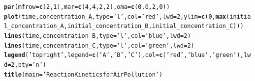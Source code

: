 \documentclass{tufte-handout}\usepackage[]{graphicx}\usepackage[]{xcolor}
\makeatletter
\newcommand{\hlnum}[1]{\textcolor[rgb]{0.686,0.059,0.569}{#1}}%
\newcommand{\hlstr}[1]{\textcolor[rgb]{0.192,0.494,0.8}{#1}}%
\newcommand{\hlstd}[1]{\textcolor[rgb]{0.345,0.345,0.345}{#1}}%
\newcommand{\hlkwc}[1]{\textcolor[rgb]{0.333,0.667,0.333}{#1}}%
\newcommand{\hlkwd}[1]{\textcolor[rgb]{0.737,0.353,0.396}{\textbf{#1}}}%
\newenvironment{kframe}{%
 \def\at@end@of@kframe{}%
 \ifinner\ifhmode%
  \def\at@end@of@kframe{\end{minipage}}%
  \begin{minipage}{\columnwidth}%
 \fi\fi%
 \def\FrameCommand##1{\hskip\@totalleftmargin \hskip-\fboxsep
 \colorbox{shadecolor}{##1}\hskip-\fboxsep
     \hskip-\linewidth \hskip-\@totalleftmargin \hskip\columnwidth}%
 \MakeFramed {\advance\hsize-\width
   \@totalleftmargin\z@ \linewidth\hsize
   \@setminipage}}%
 {\par\unskip\endMakeFramed%
 \at@end@of@kframe}
\newenvironment{knitrout}{}{} %
\makeatother
\begin{document}
\begin{knitrout}
\begin{kframe}
\begin{alltt}
\hlkwd{par}\hlstd{(}\hlkwc{mfrow} \hlstd{=} \hlkwd{c}\hlstd{(}\hlnum{2}\hlstd{,} \hlnum{1}\hlstd{),} \hlkwc{mar} \hlstd{=} \hlkwd{c}\hlstd{(}\hlnum{4}\hlstd{,} \hlnum{4}\hlstd{,} \hlnum{2}\hlstd{,} \hlnum{2}\hlstd{),} \hlkwc{oma} \hlstd{=} \hlkwd{c}\hlstd{(}\hlnum{0}\hlstd{,} \hlnum{0}\hlstd{,} \hlnum{2}\hlstd{,} \hlnum{0}\hlstd{))}
\hlkwd{plot}\hlstd{(time, concentration_A,} \hlkwc{type} \hlstd{=} \hlstr{'l'}\hlstd{,} \hlkwc{col} \hlstd{=} \hlstr{'red'}\hlstd{,} \hlkwc{lwd} \hlstd{=} \hlnum{2}\hlstd{,} \hlkwc{ylim} \hlstd{=} \hlkwd{c}\hlstd{(}\hlnum{0}\hlstd{,} \hlkwd{max}\hlstd{(initial_concentration_A, initial_concentration_B, initial_concentration_C)))}
\hlkwd{lines}\hlstd{(time, concentration_B,} \hlkwc{type} \hlstd{=} \hlstr{'l'}\hlstd{,} \hlkwc{col} \hlstd{=} \hlstr{'blue'}\hlstd{,} \hlkwc{lwd} \hlstd{=} \hlnum{2}\hlstd{)}
\hlkwd{lines}\hlstd{(time, concentration_C,} \hlkwc{type} \hlstd{=} \hlstr{'l'}\hlstd{,} \hlkwc{col} \hlstd{=} \hlstr{'green'}\hlstd{,} \hlkwc{lwd} \hlstd{=} \hlnum{2}\hlstd{)}
\hlkwd{legend}\hlstd{(}\hlstr{'topright'}\hlstd{,} \hlkwc{legend} \hlstd{=} \hlkwd{c}\hlstd{(}\hlstr{'A'}\hlstd{,} \hlstr{'B'}\hlstd{,} \hlstr{'C'}\hlstd{),} \hlkwc{col} \hlstd{=} \hlkwd{c}\hlstd{(}\hlstr{'red'}\hlstd{,} \hlstr{'blue'}\hlstd{,} \hlstr{'green'}\hlstd{),} \hlkwc{lwd} \hlstd{=} \hlnum{2}\hlstd{,} \hlkwc{bty} \hlstd{=} \hlstr{'n'}\hlstd{)}
\hlkwd{title}\hlstd{(}\hlkwc{main} \hlstd{=} \hlstr{'Reaction Kinetics for Air Pollution'}\hlstd{)}


\end{alltt}
\end{kframe}
\end{knitrout}
\end{document}
